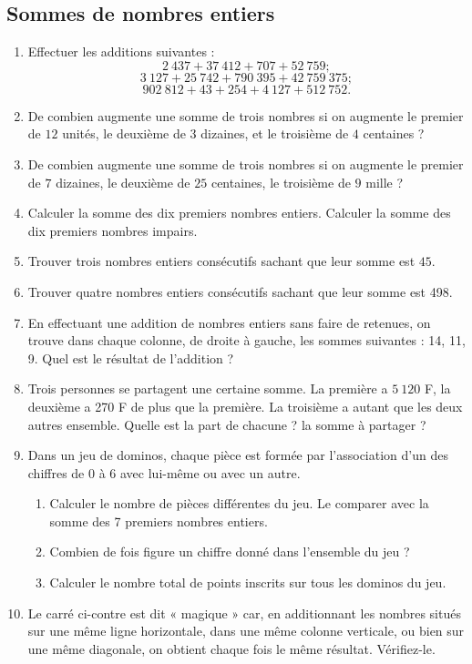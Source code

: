 \documentclass[12 pt]{extarticle}
\theoremstyle{plain}
\begin{document}
 \subsection{Sommes de nombres entiers}
 \begin{enumerate}
\item Effectuer les additions suivantes : 
\[ 2\ 437 + 37\ 412 + 707 + 52\ 759 ;\]
\[ 3~127+ 25~742+790~395 + 42~759~375 ;\]
\[ 902~812+ 43 + 254 + 4~127 + 512~752.\]
\item De combien augmente une somme de trois nombres si on augmente le premier de $12$ unités, le deuxième de $3$ dizaines, et le troisième de $4$ centaines ?
\item De combien augmente une somme de trois nombres si on augmente le premier de $7$ dizaines, le deuxième de $25$ centaines, le troisième de $9$ mille ?
\item Calculer la somme des dix premiers nombres entiers. 
Calculer la somme des dix premiers nombres impairs.
\item Trouver trois nombres entiers consécutifs sachant que leur somme est $45$. 
\item Trouver quatre nombres entiers consécutifs sachant que leur somme est 498. 
\item En effectuant une addition de nombres entiers sans faire de retenues, on 
trouve dans chaque colonne, de droite à gauche, les sommes suivantes : 14, 11, 9. Quel est le résultat de l'addition ? 
\item Trois personnes se partagent une certaine somme. La première a $5~120$ F, la deuxième a 270 F de plus que la première. La troisième a autant que les deux autres ensemble. Quelle est la part de chacune ? la somme à partager ?
\item Dans un jeu de dominos, chaque pièce est formée par l'association d'un des chiffres de $0$ à $6$ avec lui-même ou avec un autre. \begin{enumerate}
\item Calculer le nombre de pièces différentes du jeu. Le comparer avec la somme des 7 premiers nombres entiers.
\item Combien de fois figure un chiffre donné dans l'ensemble du jeu ? 
\item Calculer le nombre total de points inscrits sur tous les dominos du jeu.
\end{enumerate}
\item \begin{enumerate}
Le carré ci-contre est dit « magique » car, en additionnant les nombres situés sur une même ligne horizontale, dans une même colonne verticale, ou bien sur une même diagonale, on obtient chaque fois le même résultat. Vérifiez-le. 

\end{enumerate}
\end{enumerate}
\end{document}
